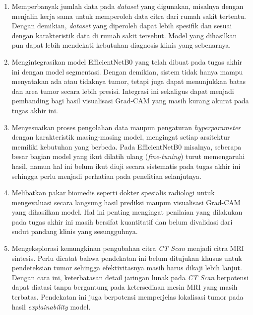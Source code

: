 \begin{enumerate}
	\item Memperbanyak jumlah data pada \textit{dataset} yang digunakan, misalnya dengan menjalin kerja sama untuk memperoleh data citra dari rumah sakit tertentu. Dengan demikian, \textit{dataset} yang diperoleh dapat lebih spesifik dan sesuai dengan karakteristik data di rumah sakit tersebut. Model yang dihasilkan pun dapat lebih mendekati kebutuhan diagnosis klinis yang sebenarnya.
	
	\item Mengintegrasikan model EfficientNetB0 yang telah dibuat pada tugas akhir ini dengan model segmentasi. Dengan demikian, sistem tidak hanya mampu menyatakan ada atau tidaknya tumor, tetapi juga dapat menunjukkan batas dan area tumor secara lebih presisi. Integrasi ini sekaligus dapat menjadi pembanding bagi hasil visualisasi Grad-CAM yang masih kurang akurat pada tugas akhir ini.
	
	\item Menyesuaikan proses pengolahan data maupun pengaturan \textit{hyperparameter} dengan karakteristik masing-masing model, mengingat setiap arsitektur memiliki kebutuhan yang berbeda. Pada EfficientNetB0 misalnya, seberapa besar bagian model yang ikut dilatih ulang (\textit{fine-tuning}) turut memengaruhi hasil, namun hal ini belum ikut diuji secara sistematis pada tugas akhir ini sehingga perlu menjadi perhatian pada penelitian selanjutnya.
	
	\item Melibatkan pakar biomedis seperti dokter spesialis radiologi untuk mengevaluasi secara langsung hasil prediksi maupun visualisasi Grad-CAM yang dihasilkan model. Hal ini penting mengingat penilaian yang dilakukan pada tugas akhir ini masih bersifat kuantitatif dan belum divalidasi dari sudut pandang klinis yang sesungguhnya.
	
	\item Mengeksplorasi kemungkinan pengubahan citra \textit{CT Scan} menjadi citra MRI sintesis. Perlu dicatat bahwa pendekatan ini belum ditujukan khusus untuk pendeteksian tumor sehingga efektivitasnya masih harus dikaji lebih lanjut. Dengan cara ini, keterbatasan detail jaringan lunak pada \textit{CT Scan} berpotensi dapat diatasi tanpa bergantung pada ketersediaan mesin MRI yang masih terbatas. Pendekatan ini juga berpotensi memperjelas lokalisasi tumor pada hasil \textit{explainability} model.
\end{enumerate}